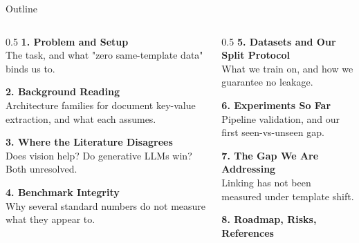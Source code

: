 \documentclass[aspectratio=169, 11pt]{beamer}
\begin{document}
\begin{frame}{Outline}
  \begin{columns}[T]
    \begin{column}{0.5\textwidth}
      \textbf{1. Problem and Setup}\\
      {\footnotesize\color{muted} The task, and what "zero same-template data" binds us to.}
      \medskip

      \textbf{2. Background Reading}\\
      {\footnotesize\color{muted} Architecture families for document key-value extraction, and what each assumes.}
      \medskip

      \textbf{3. Where the Literature Disagrees}\\
      {\footnotesize\color{muted} Does vision help? Do generative LLMs win? Both unresolved.}
      \medskip

      \textbf{4. Benchmark Integrity}\\
      {\footnotesize\color{muted} Why several standard numbers do not measure what they appear to.}
    \end{column}
    \begin{column}{0.5\textwidth}
      \textbf{5. Datasets and Our Split Protocol}\\
      {\footnotesize\color{muted} What we train on, and how we guarantee no leakage.}
      \medskip

      \textbf{6. Experiments So Far}\\
      {\footnotesize\color{muted} Pipeline validation, and our first seen-vs-unseen gap.}
      \medskip

      \textbf{7. The Gap We Are Addressing}\\
      {\footnotesize\color{muted} Linking has not been measured under template shift.}
      \medskip

      \textbf{8. Roadmap, Risks, References}
    \end{column}
  \end{columns}
\end{frame}
\end{document}
